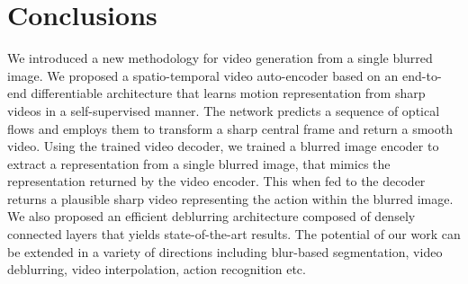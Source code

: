 \documentclass[10pt,twocolumn,letterpaper]{article}
\begin{document}
\section{Conclusions}
We introduced a new methodology for video generation from a single blurred image. We proposed a spatio-temporal video auto-encoder based on an end-to-end differentiable architecture that learns motion representation from sharp videos in a self-supervised manner. The network predicts a sequence of optical flows and employs them to transform a sharp central frame and return a smooth video. Using the trained video decoder, we trained a blurred image encoder to extract a representation from a single blurred image, that mimics the representation returned by the video encoder. This when fed to the decoder returns a plausible sharp video representing the action within the blurred image. We also proposed an efficient deblurring architecture composed of densely connected layers that yields state-of-the-art results. The potential of our work can be extended in a variety of directions including blur-based segmentation, video deblurring, video interpolation, action recognition etc.


{\small


}
\end{document}

